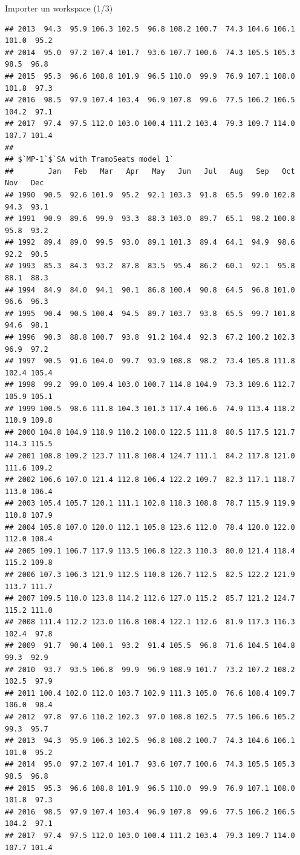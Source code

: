 \documentclass[10pt,xcolor=table,color={dvipsnames,usenames},ignorenonframetext,usepdftitle=false,french]{beamer}
\begin{document}
\begin{frame}[fragile]{Importer un workspace (1/3)}
\begin{verbatim}
## 2013  94.3  95.9 106.3 102.5  96.8 108.2 100.7  74.3 104.6 106.1 101.0  95.2
## 2014  95.0  97.2 107.4 101.7  93.6 107.7 100.6  74.3 105.5 105.3  98.5  96.8
## 2015  95.3  96.6 108.8 101.9  96.5 110.0  99.9  76.9 107.1 108.0 101.8  97.3
## 2016  98.5  97.9 107.4 103.4  96.9 107.8  99.6  77.5 106.2 106.5 104.2  97.1
## 2017  97.4  97.5 112.0 103.0 100.4 111.2 103.4  79.3 109.7 114.0 107.7 101.4
## 
## $`MP-1`$`SA with TramoSeats model 1`
##        Jan   Feb   Mar   Apr   May   Jun   Jul   Aug   Sep   Oct   Nov   Dec
## 1990  90.5  92.6 101.9  95.2  92.1 103.3  91.8  65.5  99.0 102.8  94.3  93.1
## 1991  90.9  89.6  99.9  93.3  88.3 103.0  89.7  65.1  98.2 100.8  95.8  93.2
## 1992  89.4  89.0  99.5  93.0  89.1 101.3  89.4  64.1  94.9  98.6  92.2  90.5
## 1993  85.3  84.3  93.2  87.8  83.5  95.4  86.2  60.1  92.1  95.8  88.1  88.3
## 1994  84.9  84.0  94.1  90.1  86.8 100.4  90.8  64.5  96.8 101.0  96.6  96.3
## 1995  90.4  90.5 100.4  94.5  89.7 103.7  93.8  65.5  99.7 101.8  94.6  98.1
## 1996  90.3  88.8 100.7  93.8  91.2 104.4  92.3  67.2 100.2 102.3  96.9  97.2
## 1997  90.5  91.6 104.0  99.7  93.9 108.8  98.2  73.4 105.8 111.8 102.4 105.4
## 1998  99.2  99.0 109.4 103.0 100.7 114.8 104.9  73.3 109.6 112.7 105.9 105.1
## 1999 100.5  98.6 111.8 104.3 101.3 117.4 106.6  74.9 113.4 118.2 110.9 109.8
## 2000 104.8 104.9 118.9 110.2 108.0 122.5 111.8  80.5 117.5 121.7 114.3 115.5
## 2001 108.8 109.2 123.7 111.8 108.4 124.7 111.1  84.2 117.8 121.0 111.6 109.2
## 2002 106.6 107.0 121.4 112.8 106.4 122.2 109.7  82.3 117.1 118.7 113.0 106.4
## 2003 105.4 105.7 120.1 111.1 102.8 118.3 108.8  78.7 115.9 119.9 110.8 107.9
## 2004 105.8 107.0 120.0 112.1 105.8 123.6 112.0  78.4 120.0 122.0 112.0 108.4
## 2005 109.1 106.7 117.9 113.5 106.8 122.3 110.3  80.0 121.4 118.4 115.2 109.8
## 2006 107.3 106.3 121.9 112.5 110.8 126.7 112.5  82.5 122.2 121.9 113.7 111.7
## 2007 109.5 110.0 123.8 114.2 112.6 127.0 115.2  85.7 121.2 124.7 115.2 111.0
## 2008 111.4 112.2 123.0 116.8 108.4 122.1 112.6  81.9 117.3 116.3 102.4  97.8
## 2009  91.7  90.4 100.1  93.2  91.4 105.5  96.8  71.6 104.5 104.8  99.3  92.9
## 2010  93.7  93.5 106.8  99.9  96.9 108.9 101.7  73.2 107.2 108.2 102.5  97.9
## 2011 100.4 102.0 112.0 103.7 102.9 111.3 105.0  76.6 108.4 109.7 106.0  98.4
## 2012  97.8  97.6 110.2 102.3  97.0 108.8 102.5  77.5 106.6 105.2  99.3  95.7
## 2013  94.3  95.9 106.3 102.5  96.8 108.2 100.7  74.3 104.6 106.1 101.0  95.2
## 2014  95.0  97.2 107.4 101.7  93.6 107.7 100.6  74.3 105.5 105.3  98.5  96.8
## 2015  95.3  96.6 108.8 101.9  96.5 110.0  99.9  76.9 107.1 108.0 101.8  97.3
## 2016  98.5  97.9 107.4 103.4  96.9 107.8  99.6  77.5 106.2 106.5 104.2  97.1
## 2017  97.4  97.5 112.0 103.0 100.4 111.2 103.4  79.3 109.7 114.0 107.7 101.4
\end{verbatim}

\end{frame}
\end{document}
